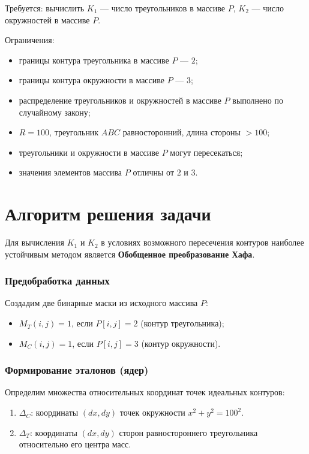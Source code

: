\documentclass{article}[14pt]
\begin{document}
Требуется: вычислить $K_1$ --- число треугольников в массиве $P$, $K_2$ --- число окружностей в массиве $P$. 

\bigskip

Ограничения: 
\begin{itemize}
    \item границы контура треугольника в массиве $P$ --- $2$;
    \item границы контура окружности в массиве $P$ --- $3$;
    \item распределение треугольников и окружностей в массиве $P$ выполнено по случайному закону;
    \item $R=100$, треугольник $ABC$ равносторонний, длина стороны $>100$;
    \item треугольники и окружности в массиве $P$ могут пересекаться;
    \item значения элементов массива $P$ отличны от $2$ и $3$.
\end{itemize}
 
\pagebreak

\section{Алгоритм решения задачи}

Для вычисления $K_1$ и $K_2$ в условиях возможного пересечения контуров наиболее устойчивым методом является \textbf{Обобщенное преобразование Хафа}.

\subsubsection*{Предобработка данных}
Создадим две бинарные маски из исходного массива $P$:
\begin{itemize}
    \item $M_T(i, j) = 1$, если $P[i,j] = 2$ (контур треугольника);
    \item $M_C(i, j) = 1$, если $P[i,j] = 3$ (контур окружности).
\end{itemize}

\subsubsection*{Формирование эталонов (ядер)}
Определим множества относительных координат точек идеальных контуров:
\begin{enumerate}
    \item $\Delta_C$: координаты $(dx, dy)$ точек окружности $x^2 + y^2 = 100^2$.
    \item $\Delta_T$: координаты $(dx, dy)$ сторон равностороннего треугольника относительно его центра масс.
\end{enumerate}
\end{document}
